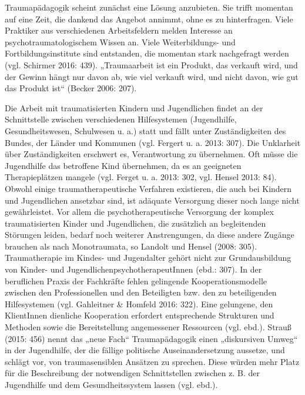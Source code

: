 Traumapädagogik scheint zunächst eine Lösung anzubieten. Sie trifft momentan auf eine Zeit, die dankend das Angebot annimmt, ohne es zu hinterfragen. Viele Praktiker aus verschiedenen Arbeitsfeldern melden Interesse an psychotraumatologischem Wissen an. Viele Weiterbildungs- und Fortbildungsinstitute sind entstanden, die momentan stark nachgefragt werden (vgl. Schirmer 2016: 439). „Traumaarbeit ist ein Produkt, das verkauft wird, und der Gewinn hängt nur davon ab, wie viel verkauft wird, und nicht davon, wie gut das Produkt ist“ (Becker 2006: 207).

Die Arbeit mit traumatisierten Kindern und Jugendlichen findet an der Schnittstelle zwischen verschiedenen Hilfesystemen (Jugendhilfe, Gesundheitswesen, Schulwesen u. a.) statt und fällt unter Zuständigkeiten des Bundes, der Länder und Kommunen (vgl. Fergert u. a. 2013: 307). Die Unklarheit über Zuständigkeiten erschwert es, Verantwortung zu übernehmen. Oft müsse die Jugendhilfe das betroffene Kind übernehmen, da es an geeigneten Therapieplätzen mangele (vgl. Ferget u. a. 2013: 302, vgl. Hensel 2013: 84). Obwohl einige traumatherapeutische Verfahren existieren, die auch bei Kindern und Jugendlichen ansetzbar sind, ist adäquate Versorgung dieser noch lange nicht gewährleistet. Vor allem die psychotherapeutische Versorgung der komplex traumatisierten Kinder und Jugendlichen, die zusätzlich an begleitenden Störungen leiden, bedarf noch weiterer Anstrengungen, da diese andere Zugänge brauchen als nach Monotraumata, so Landolt und Hensel (2008: 305). Traumatherapie im Kindes- und Jugendalter gehört nicht zur Grundausbildung von Kinder- und JugendlichenpsychotherapeutInnen (ebd.: 307). In der beruflichen Praxis der Fachkräfte fehlen gelingende Kooperationsmodelle zwischen den Professionellen und den Beteiligten bzw. den zu beteiligenden Hilfesystemen (vgl. Gahleitner \& Homfeld 2016: 322). Eine gelungene, den KlientInnen dienliche Kooperation erfordert entsprechende Strukturen und Methoden sowie die Bereitstellung angemessener Ressourcen (vgl. ebd.). Strauß (2015: 456) nennt das „neue Fach“ Traumapädagogik einen „diskursiven Umweg“ in der Jugendhilfe, der die fällige politische Auseinandersetzung aussetze, und schlägt vor, von traumasensiblen Ansätzen zu sprechen. Diese würden mehr Platz für die Beschreibung der notwendigen Schnittstellen zwischen z. B. der Jugendhilfe und dem Gesundheitssystem lassen (vgl. ebd.).

